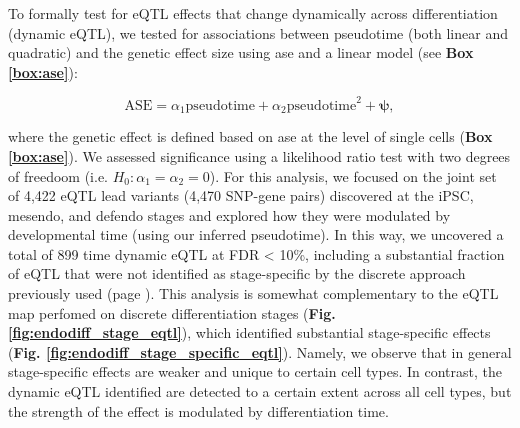 To formally test for eQTL effects that change dynamically across differentiation (dynamic eQTL), we tested for associations between pseudotime (both linear and quadratic) and the genetic effect size using \gls{ase} and a linear model (see \textbf{Box \ref{box:ase}}):

\begin{equation}\label{eq:endodiff_ase_pseudotime}
    \mathrm{ASE} = \alpha_1 \mathrm{pseudotime} + \alpha_2 \mathrm{pseudotime}^2 + \boldsymbol{\psi},
\end{equation}

where the genetic effect is defined based on \gls{ase} at the level of single cells (\textbf{Box \ref{box:ase}}).
We assessed significance using a likelihood ratio test with two degrees of freedoom (i.e. $H_0: \alpha_1 = \alpha_2 = 0$). 
For this analysis, we focused on the joint set of 4,422 eQTL lead variants (4,470 SNP-gene pairs) discovered at the iPSC, mesendo, and defendo stages and explored how they were modulated by developmental time (using our inferred pseudotime).
In this way, we uncovered a total of 899 time dynamic eQTL at FDR < 10\%, including a substantial fraction of eQTL that were not identified as stage-specific by the discrete approach previously used (page \pageref{fig:endodiff_stage_specific_eqtl}).
This analysis is somewhat complementary to the eQTL map perfomed on discrete differentiation stages (\textbf{Fig. \ref{fig:endodiff_stage_eqtl}}), which identified substantial stage-specific effects (\textbf{Fig. \ref{fig:endodiff_stage_specific_eqtl}}).
Namely, we observe that in general stage-specific effects are weaker and unique to certain cell types.
In contrast, the dynamic eQTL identified are detected to a certain extent across all cell types, but the strength of the effect is modulated by differentiation time. \\

